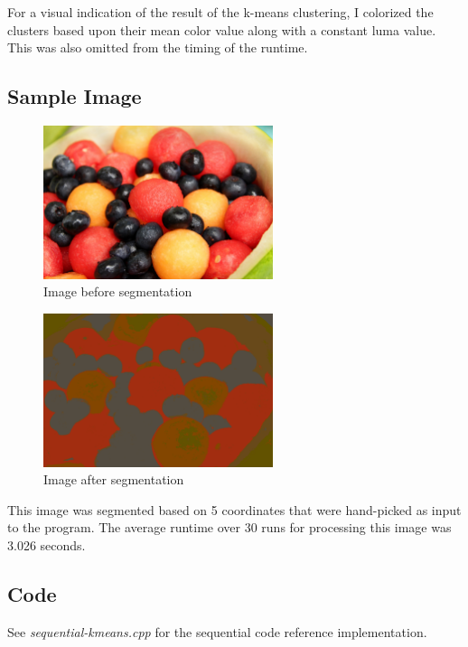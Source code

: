 \documentclass[11pt]{article}
\begin{document}
For a visual indication of the result of the k-means clustering, I colorized the clusters
based upon their mean color value along with a constant luma value. This was also omitted
from the timing of the runtime.

\subsection{Sample Image}

\begin{figure}
    \centering
    \includegraphics[width=0.6\textwidth]{fruit.png}
    \caption{Image\cite{fruit} before segmentation}
    \label{fig:fruit}
\end{figure}

\begin{figure}
    \centering
    \includegraphics[width=0.6\textwidth]{fruit-segmented.png}
    \caption{Image after segmentation}
    \label{fig:fruit-segmented}
\end{figure}

This image was segmented based on 5 coordinates that were hand-picked as input to the program.
The average runtime over 30 runs for processing this image was 3.026 seconds. 

\subsection{Code}

See \emph{sequential-kmeans.cpp} for the sequential code reference implementation.
\end{document}
